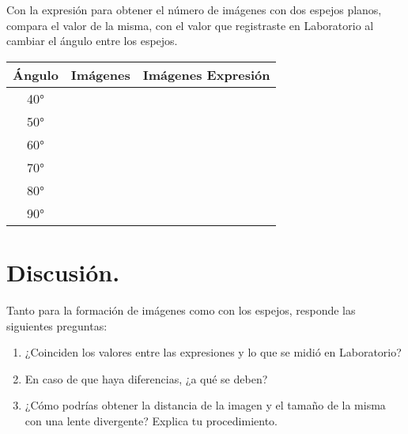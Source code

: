 \documentclass[14pt]{extarticle}
\begin{document}
Con la expresión para obtener el número de imágenes con dos espejos planos, compara el valor de la misma, con el valor que registraste en Laboratorio al cambiar el ángulo entre los espejos.
\begin{table}[H]
    \centering
    \begin{tabular}{| c | c | c |} \hline
    Ángulo & Imágenes & Imágenes Expresión \\ \hline
    \ang{40} & & \\ \hline
    \ang{50} & & \\ \hline
    \ang{60} & & \\ \hline
    \ang{70} & & \\ \hline
    \ang{80} & & \\ \hline
    \ang{90} & & \\ \hline
    \end{tabular}
\end{table}

\section{Discusión.}

Tanto para la formación de imágenes como con los espejos, responde las siguientes preguntas:
\begin{enumerate}
    \item ¿Coinciden los valores entre las expresiones y lo que se midió en Laboratorio?
    \item En caso de que haya diferencias, ¿a qué se deben?
    \item ¿Cómo podrías obtener la distancia de la imagen y el tamaño de la misma con una lente divergente? Explica tu procedimiento.
\end{enumerate}
\end{document}
